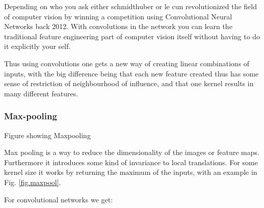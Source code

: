 Depending on who you ask either schmidthuber or le cun revolutionized the field of computer vision by winning a competition using Convolutional Neural Networks back 2012. With convolutions in the network you can learn the traditional feature engineering part of computer vision itself without having to do it explicitly your self.

Thus using convolutions one gets a new way of creating linear combinations of inputs, with the big difference being that each new feature created thus has some sense of restriction of neighbourhood of influence, and that one kernel results in many different features. 
\subsubsection{Max-pooling}
\begin{marginfigure}
\caption{Figure showing Maxpooling}
\label{fig.maxpool}
\end{marginfigure} 
Max pooling is a way to reduce the dimensionality of the images or feature maps. Furthermore it introduces some kind of invariance to local translations. For some kernel size it works by returning the maximum of the inputs, with an example in Fig. \ref{fig.maxpool}.

For convolutional networks we get:\\
\cite{heDeepResidualLearning2015}
\cite{tompsonEfficientObjectLocalization2015}
\cite{szegedyGoingDeeperConvolutions2015}
\cite{szegedyInceptionv4InceptionResNetImpact2017}
\cite{azulayWhyDeepConvolutional2019}
\cite{huangSNDCNNSelfnormalizingDeep2020}

